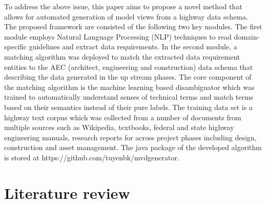 \documentclass[NewProceedings, InsideFigs]{ascelike} %
\begin{document}

%
To address the above issue, this paper aims to propose a novel method that allows for automated generation of model views from a highway data schema. The proposed framework are consisted of the following two key modules. The first module employs Natural Language Processing (NLP) techniques to read domain-specific guidelines and extract data requirements. In the second module, a matching algorithm was deployed to match the extracted data requirement entities to the AEC (architect, engineering and construction) data schema that describing the data generated in the up stream phases. The core component of the matching algorithm is the machine learning based disambiguator which was trained to automatically understand senses of technical terms and match terms based on their semantics instead of their pure labels. The training data set is a highway text corpus which was collected from a number of documents from multiple sources such as Wikipedia, textbooks, federal and state highway engineering manuals, research reports for across project phases including design, construction and asset management. The java package of the developed algorithm is stored at https://github.com/tuyenbk/mvdgenerator.
%
\section{Literature review} \label{sec:litrev} %
\end{document}
